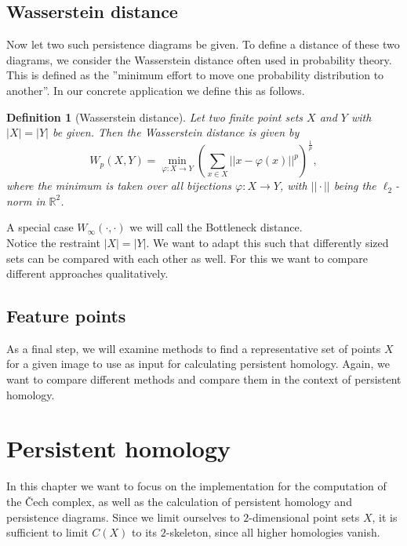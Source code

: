 \documentclass[11pt, a4paper, UKenglish]{article}
\newtheorem{definition}{Definition}
\newcommand{\bR}{\mathbb{R}}
\begin{document}
    \subsection{Wasserstein distance}\label{subsec:wasserstein-distance}

    Now let two such persistence diagrams be given.
    To define a distance of these two diagrams, we consider the Wasserstein distance often used in probability theory.
    This is defined as the ''minimum effort to move one probability distribution to another''.
    In our concrete application we define this as follows.
    \begin{definition}[Wasserstein distance]
        Let two finite point sets $X$ and $Y$ with $|X|=|Y|$ be given.
        Then the Wasserstein distance is given by\[W_p(X,Y) = \min_{\varphi:X\rightarrow Y}\left(\sum_{x\in X}||x-\varphi(x)||^p\right)^{\frac{1}{p}},\]
        where the minimum is taken over all bijections $\varphi:X\rightarrow Y$, with $||\cdot||$ being the $\ell_2$-norm in $\bR^2$.
    \end{definition}
    A special case $W_\infty(\cdot,\cdot)$ we will call the Bottleneck distance.\\
    Notice the restraint $|X| = |Y|$.
    We want to adapt this such that differently sized sets can be compared with each other as well.
    For this we want to compare different approaches qualitatively.

    \subsection{Feature points}\label{subsec:feature-proposals}

    As a final step, we will examine methods to find a representative set of points $X$ for a given image to use as input for calculating persistent homology.
    Again, we want to compare different methods and compare them in the context of persistent homology.
    \section{Persistent homology}\label{sec:persistent-homology2}

    In this chapter we want to focus on the implementation for the computation of the Čech complex, as well as the calculation of persistent homology and persistence diagrams.
    Since we limit ourselves to $2$-dimensional point sets $X$, it is sufficient to limit $C(X)$ to its $2$-skeleton, since all higher homologies vanish.
\end{document}
